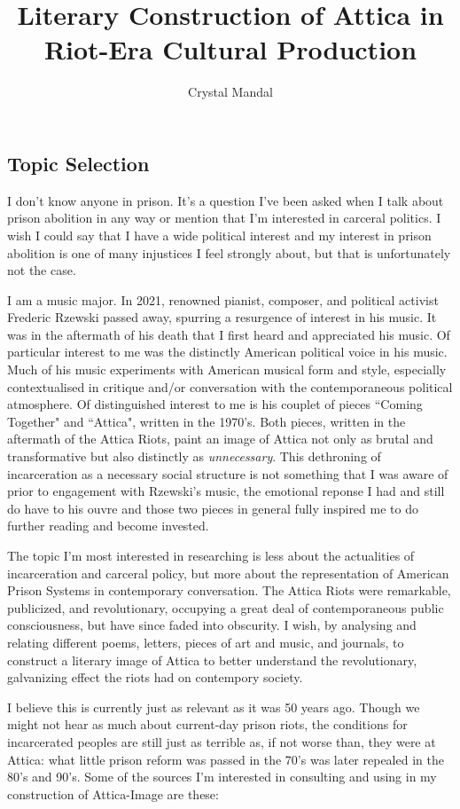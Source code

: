 \documentclass[12pt, letterpaper]{article}
\title{Literary Construction of Attica in Riot-Era Cultural Production}
\author{Crystal Mandal}
\begin{document}
\maketitle

\subsection*{Topic Selection}
I don't know anyone in prison. It's a question I've been asked 
when I talk about prison abolition in any way or mention that 
I'm interested in carceral politics. I wish I could say that 
I have a wide political interest and my interest in prison 
abolition is one of many injustices I feel strongly about, but 
that is unfortunately not the case. 

I am a music major. In 2021, renowned pianist, composer, and 
political activist Frederic Rzewski passed away, spurring a 
resurgence of interest in his music. It was in the aftermath 
of his death that I first heard and appreciated his music. 
Of particular interest to me was the distinctly American 
political voice in his music. Much of his music experiments 
with American musical form and style, especially contextualised 
in critique and/or conversation with the contemporaneous 
political atmosphere. Of distinguished interest to me is his 
couplet of pieces ``Coming Together" and ``Attica", written in 
the 1970's. Both pieces, written in the aftermath of the Attica 
Riots, paint an image of Attica not only as brutal and transformative 
but also distinctly as \textit{unnecessary}. This dethroning of 
incarceration as a necessary social structure is not something 
that I was aware of prior to engagement with Rzewski's music, 
the emotional reponse I had and still do have to his ouvre and 
those two pieces in general fully inspired me to do further 
reading and become invested.

The topic I'm most interested in researching is less about 
the actualities of incarceration and carceral policy, but 
more about the representation of American Prison Systems in 
contemporary conversation. The Attica Riots were remarkable, publicized, 
and revolutionary, occupying a great deal of contemporaneous public 
consciousness, but have since faded into obscurity. I wish, 
by analysing and relating different poems, letters, pieces of 
art and music, and journals, to construct a literary image of 
Attica to better understand the revolutionary, galvanizing effect 
the riots had on contempory society. 

I believe this is currently just as relevant as it was 50 years 
ago. Though we might not hear as much about current-day prison 
riots, the conditions for incarcerated peoples are still just 
as terrible as, if not worse than, they were at Attica: what little 
prison reform was passed in the 70's was later repealed in the 80's 
and 90's. Some of the sources I'm interested in consulting and using in my 
construction of Attica-Image are these:



\nocite{*}

\printbibliography
\end{document}
